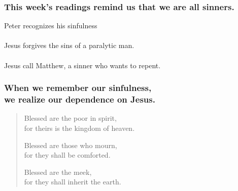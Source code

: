 \documentclass{beamer}
\begin{document}
\begin{frame}
\frametitle{This week's readings remind us that we are all sinners.}

Peter recognizes his sinfulness\\~\\
Jesus forgives the sins of a paralytic man.\\~\\
Jesus call Matthew, a sinner who wants to repent.


\end{frame}

\begin{frame}
\frametitle{When we remember our sinfulness,\\we realize  our dependence on Jesus.}
\begin{verse}
Blessed are the poor in spirit,\\for theirs is the kingdom of heaven.

Blessed are those who mourn,\\for they shall be comforted.

Blessed are the meek,\\for they shall inherit the earth.

\end{verse}
\end{frame}

\begin{frame}
\frametitle{\insertlecture}
\tableofcontents[sectionstyle=show/show]
\end{frame}
\end{document}
